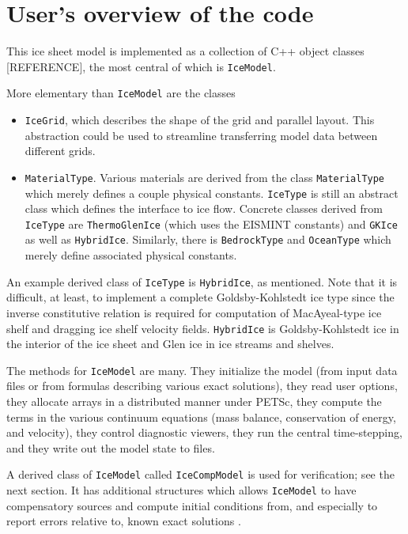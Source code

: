 \documentclass[11pt,final]{amsart}
\renewcommand{\t}[1]{\texttt{#1}}
\begin{document}
\section{User's overview of the code}  This ice sheet model is implemented as a collection of C++ object classes [REFERENCE], the most central of which is \t{IceModel}.

More elementary than \t{IceModel} are the classes\begin{itemize}
\item \t{IceGrid}, which describes the shape of the grid and parallel
layout. This abstraction could be used to streamline transferring model data between
different grids.
\item \t{MaterialType}.  Various materials are derived from the class \t{MaterialType} which merely defines a couple
physical constants. \t{IceType} is still an abstract class which defines the interface to
ice flow. Concrete classes derived from \t{IceType} are \t{ThermoGlenIce} (which uses the
EISMINT constants) and \t{GKIce} as well as \t{HybridIce}.  Similarly, there is \t{BedrockType} and \t{OceanType} which merely define
associated physical constants.\end{itemize}

An example derived class of \t{IceType} is \t{HybridIce}, as mentioned.  Note that it is difficult, at least, to implement a complete Goldsby-Kohlstedt ice type \cite{GoldsbyKohlstedt} since the inverse constitutive
relation is required for computation of MacAyeal-type ice shelf and dragging ice shelf \cite{MacAyeal} velocity fields. \t{HybridIce} is Goldsby-Kohlstedt ice in the interior of the ice sheet and Glen ice in ice streams and
shelves.

The methods for \t{IceModel} are many.  They initialize the model (from input data files or from formulas describing various exact solutions), they read user options, they allocate arrays in a distributed manner under PETSc, they compute the terms in the various continuum equations (mass balance, conservation of energy, and velocity), they control diagnostic viewers, they run the central time-stepping, and they write out the model state to files.

A derived class of \t{IceModel} called \t{IceCompModel} is used for verification; see the next section.  It has additional structures which allows \t{IceModel} to have compensatory sources and compute initial conditions from, and especially to report errors relative to, known exact solutions \cite{BLKCB,BBL,BB,SchoofStream}.
\end{document}
